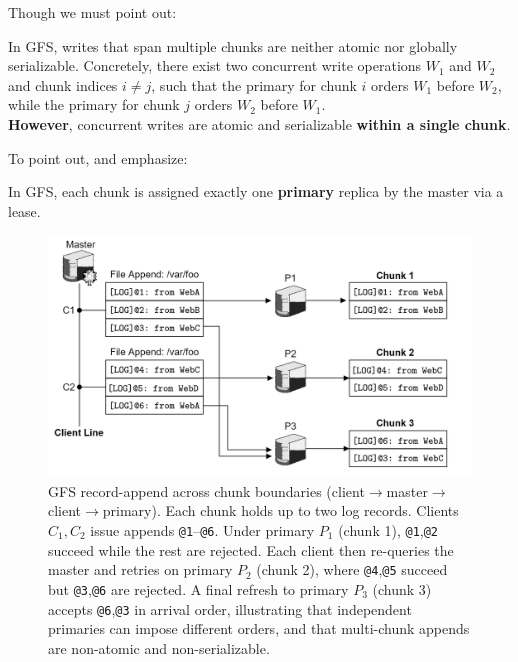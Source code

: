 \newpage 
\noindent
Though we must point out:
\begin{theo}

  In GFS, writes that span multiple chunks are neither atomic nor globally serializable. Concretely, there exist two concurrent write operations $W_1$ and $W_2$ and chunk indices $i\neq j$,
  such that the primary for chunk $i$ orders $W_1$ before $W_2$, while the primary for chunk $j$ orders $W_2$ before $W_1$.\\

  \noindent
  \textbf{However}, concurrent writes are atomic and serializable \textbf{within a single chunk}.
\end{theo}
  
\noindent
To point out, and emphasize:
\begin{Def}

  In GFS, each chunk is assigned exactly one \textbf{primary} replica by the master via a lease.
\end{Def}

\vspace{-.3em}
\begin{figure}[h]
  \centering
  \includegraphics[width=\textwidth]{Sections/gfs/atomic.png}
  \caption{GFS record-append across chunk boundaries (client$\to$master$\to$client$\to$primary). 
  Each chunk holds up to two log records. Clients $C_1,C_2$ issue appends \texttt{@1}--\texttt{@6}. Under primary $P_1$ (chunk 1), \texttt{@1},\texttt{@2} succeed while the rest are rejected. Each client then re-queries the master and retries on primary $P_2$ (chunk 2), where \texttt{@4},\texttt{@5} succeed but \texttt{@3},\texttt{@6} are rejected. A final refresh to primary $P_3$ (chunk 3)
  accepts \texttt{@6},\texttt{@3} in arrival order, illustrating that independent primaries can impose different orders, and that multi-chunk appends are non-atomic and non-serializable.}

  \label{fig:gfs-primary}
\end{figure}
    
